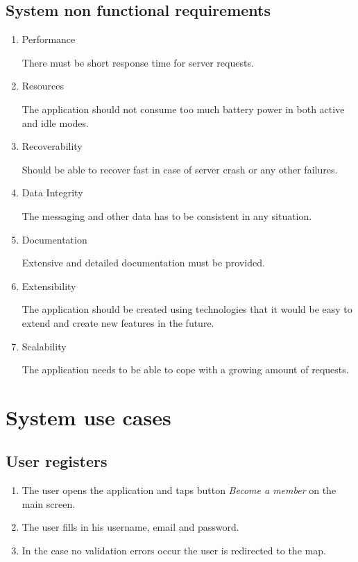 \documentclass[thesis=M,english]{FITthesis}[2012/10/20]
\begin{document}
\subsection{System non functional requirements}

\begin{enumerate}

\item{Performance} 

There must be short response time for server requests.

\item{Resources} 

The application should not consume too much battery power in both active and idle modes.

\item{Recoverability}

Should be able to recover fast in case of server crash or any other failures.

\item{Data Integrity}

The messaging and other data has to be consistent in any situation.

\item{Documentation}

Extensive and detailed documentation must be provided.

\item{Extensibility}

The application should be created using technologies that it would be easy to extend and create new features in the future.

\item{Scalability}

The application needs to be able to cope with a growing amount of requests.
\end{enumerate}

\section{System use cases}

\subsection{User registers}
\begin{enumerate}
	\item The user opens the application and taps button \textit{Become a member} on the main screen.
	\item The user fills in his username, email and password.
	\item In the case no validation errors occur the user is redirected to the map.
\end{enumerate}
\end{document}
